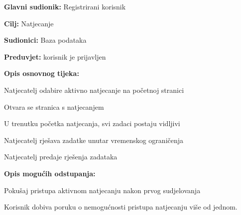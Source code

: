 					
					
					\noindent {}
					\begin{packed_item}
						
						\item \textbf{Glavni sudionik: } Registrirani korisnik
						\item  \textbf{Cilj:} Natjecanje
						\item  \textbf{Sudionici:} Baza podataka
						\item  \textbf{Preduvjet:}  korisnik je prijavljen
						\item  \textbf{Opis osnovnog tijeka:}
						
						\item[] \begin{packed_enum}
							\item Natjecatelj odabire aktivno natjecanje na početnoj stranici
							\item Otvara se stranica s natjecanjem
							\item U trenutku početka natjecanja, svi zadaci postaju vidljivi
							\item Natjecatelj rješava zadatke unutar vremenskog ograničenja
							\item Natjecatelj predaje rješenja zadataka
							
						\end{packed_enum}
						\item  \textbf{Opis mogućih odstupanja:}
						\item[] \begin{packed_item}
							
							\item[3.a] Pokušaj pristupa aktivnom natjecanju nakon prvog sudjelovanja
							\item[] \begin{packed_enum}
								\item Korisnik dobiva poruku o nemogućnosti pristupa natjecanju više od jednom.
							\end{packed_enum}
							
						\end{packed_item}
					\end{packed_item}


